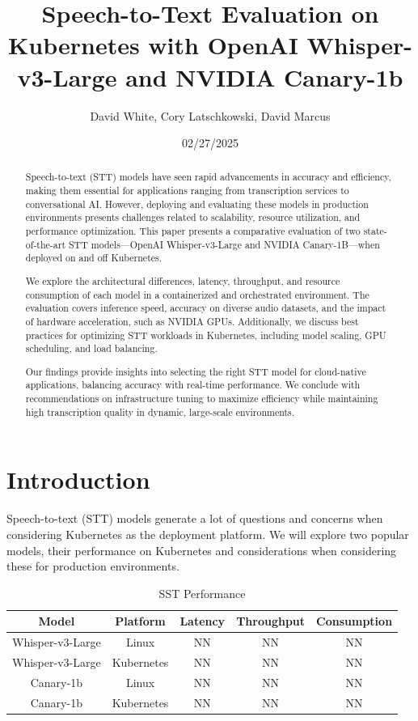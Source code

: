 \documentclass[11pt, oneside]{article}   	%
\title{Speech-to-Text Evaluation on Kubernetes with OpenAI Whisper-v3-Large and NVIDIA Canary-1b}
\author{David White, Cory Latschkowski, David Marcus}
\date{02/27/2025}							%
\begin{document}
\maketitle

\begin{abstract}
Speech-to-text (STT) models have seen rapid advancements in accuracy and efficiency, making them essential for applications ranging from transcription services to conversational AI. However, deploying and evaluating these models in production environments presents challenges related to scalability, resource utilization, and performance optimization. This paper presents a comparative evaluation of two state-of-the-art STT models—OpenAI Whisper-v3-Large and NVIDIA Canary-1B—when deployed on and off Kubernetes.

We explore the architectural differences, latency, throughput, and resource consumption of each model in a containerized and orchestrated environment. The evaluation covers inference speed, accuracy on diverse audio datasets, and the impact of hardware acceleration, such as NVIDIA GPUs. Additionally, we discuss best practices for optimizing STT workloads in Kubernetes, including model scaling, GPU scheduling, and load balancing.

Our findings provide insights into selecting the right STT model for cloud-native applications, balancing accuracy with real-time performance. We conclude with recommendations on infrastructure tuning to maximize efficiency while maintaining high transcription quality in dynamic, large-scale environments.\end{abstract}

\section{Introduction}
Speech-to-text (STT) models generate a lot of questions and concerns when considering Kubernetes as the deployment platform. We will explore two popular models, their performance on Kubernetes and considerations when considering these for production environments.

\begin{table}[h]
	\centering
	\begin{tabular}{|c|c|c|c|c|}
		\hline
		Model & Platform & Latency & Throughput & Consumption \\
		\hline
		Whisper-v3-Large & Linux & NN & NN & NN \\		
		Whisper-v3-Large & Kubernetes & NN & NN & NN \\
		Canary-1b & Linux & NN & NN & NN \\		
		Canary-1b & Kubernetes & NN & NN & NN \\
		\hline
	\end{tabular}
	\caption{SST Performance}
	\label{tab:performance}
\end{table}
\end{document}

